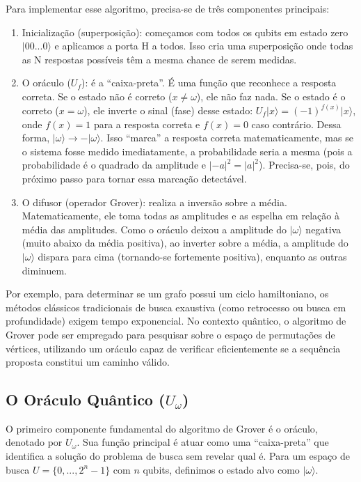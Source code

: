\documentclass[12pt, a4paper]{article}
\newcommand{\ket}[1]{\lvert #1 \rangle}
\begin{document}
Para implementar esse algoritmo, precisa-se de três componentes principais:
\begin{enumerate}[label=\Alph*.]
    \item Inicialização (superposição): começamos com todos os qubits em estado zero $\ket{00...0}$ e aplicamos a porta H a todos. Isso cria uma superposição onde todas as N respostas possíveis têm a mesma chance de serem medidas.
    \item O oráculo ($U_f$): é a ``caixa-preta''. É uma função que reconhece a resposta correta. Se o estado não é correto ($x \neq \omega$), ele não faz nada. Se o estado é o correto ($x = \omega$), ele inverte o sinal (fase) desse estado: $U_f\ket{x} = (-1)^{f(x)}\ket{x}$, onde $f(x) = 1$ para a resposta correta e $f(x) = 0$ caso contrário. Dessa forma, $\ket{\omega} \longrightarrow -\ket{\omega}$. Isso ``marca'' a resposta correta matematicamente, mas se o sistema fosse medido imediatamente, a probabilidade seria a mesma (pois a probabilidade é o quadrado da amplitude e $|-a|^2 = |a|^2$). Precisa-se, pois, do próximo passo para tornar essa marcação detectável.
    \item O difusor (operador Grover): realiza a inversão sobre a média. Matematicamente, ele toma todas as amplitudes e as espelha em relação à média das amplitudes. Como o oráculo deixou a amplitude do $\ket{\omega}$ negativa (muito abaixo da média positiva), ao inverter sobre a média, a amplitude do $\ket{\omega}$ dispara para cima (tornando-se fortemente positiva), enquanto as outras diminuem.
\end{enumerate}

Por exemplo, para determinar se um grafo possui um ciclo hamiltoniano, os métodos clássicos tradicionais de busca exaustiva (como retrocesso ou busca em profundidade) exigem tempo exponencial. No contexto quântico, o algoritmo de Grover pode ser empregado para pesquisar sobre o espaço de permutações de vértices, utilizando um oráculo capaz de verificar eficientemente se a sequência proposta constitui um caminho válido.

\subsection{O Oráculo Quântico ($U_\omega$)}

O primeiro componente fundamental do algoritmo de Grover é o oráculo, denotado por $U_\omega$. Sua função principal é atuar como uma ``caixa-preta'' que identifica a solução do problema de busca sem revelar qual é. Para um espaço de busca $U = \{0, ..., 2^n-1\}$ com $n$ qubits, definimos o estado alvo como $\ket{\omega}$.
\end{document}
